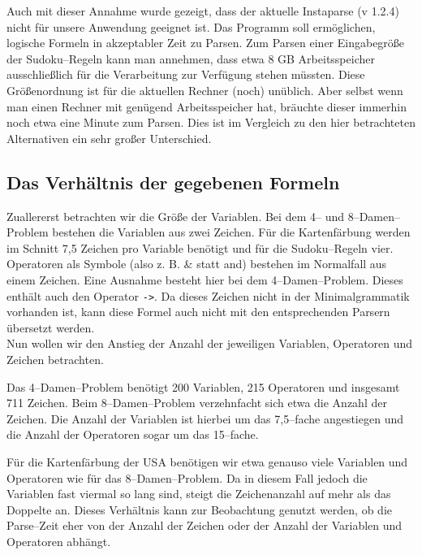\documentclass[ngerman,a4paper,abstracton,open=right,twoside=false,toc=listofnumbered,bibtotocnumbered]{scrreprt}
\begin{document}
Auch mit dieser Annahme wurde gezeigt, dass der aktuelle Instaparse (v 1.2.4) nicht für unsere Anwendung geeignet ist. Das Programm soll ermöglichen, logische Formeln in akzeptabler Zeit zu Parsen. Zum Parsen einer Eingabegröße der Sudoku--Regeln kann man annehmen, dass etwa 8 GB Arbeitsspeicher ausschließlich für die Verarbeitung zur Verfügung stehen müssten. Diese Größenordnung ist für die aktuellen Rechner (noch) unüblich. Aber selbst wenn man einen Rechner mit genügend Arbeitsspeicher hat, bräuchte dieser immerhin noch etwa eine Minute zum Parsen. Dies ist im Vergleich zu den hier betrachteten Alternativen ein sehr großer Unterschied.

\subsection{Das Verhältnis der gegebenen Formeln}

Zuallererst betrachten wir die Größe der Variablen. Bei dem 4-- und 8--Damen--Problem bestehen die Variablen aus zwei Zeichen. Für die Kartenfärbung werden im Schnitt 7,5 Zeichen pro Variable benötigt und für die Sudoku--Regeln vier.\\

Operatoren als Symbole (also z. B. \glqq{}\&\grqq{} statt \glqq{}and\grqq{}) bestehen im Normalfall aus einem Zeichen. Eine Ausnahme besteht hier bei dem 4--Damen--Problem. Dieses enthält auch den Operator \lstinline|->|. Da dieses Zeichen nicht in der Minimalgrammatik vorhanden ist, kann diese Formel auch nicht mit den entsprechenden Parsern übersetzt werden.\\

Nun wollen wir den Anstieg der Anzahl der jeweiligen Variablen, Operatoren und Zeichen betrachten.

Das 4--Damen--Problem benötigt 200 Variablen, 215 Operatoren und insgesamt 711 Zeichen. Beim 8--Damen--Problem verzehnfacht sich etwa die Anzahl der Zeichen. Die Anzahl der Variablen ist hierbei um das 7,5--fache angestiegen und die Anzahl der Operatoren sogar um das 15--fache.

Für die Kartenfärbung der USA benötigen wir etwa genauso viele Variablen und Operatoren wie für das 8--Damen--Problem. Da in diesem Fall jedoch die Variablen fast viermal so lang sind, steigt die Zeichenanzahl auf mehr als das Doppelte an. Dieses Verhältnis kann zur Beobachtung genutzt werden, ob die Parse--Zeit eher von der Anzahl der Zeichen oder der Anzahl der Variablen und Operatoren abhängt.
\end{document}
